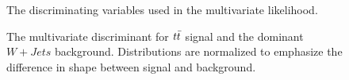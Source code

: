 \begin{figure}
\begin{center}
{    }
  \end{center}
  \caption{The discriminating variables used in the multivariate likelihood.}
  \label{img:DiscriminatingVariables}
\end{figure}


\begin{figure}
  \begin{center}

  \end{center}
  \caption{The multivariate discriminant for $t\bar{t}$ signal and the dominant $W+Jets$ background.  Distributions are normalized to emphasize the difference in shape between signal and background.}
  \label{img:LJetsLikelihoodDiscriminant}
\end{figure}


